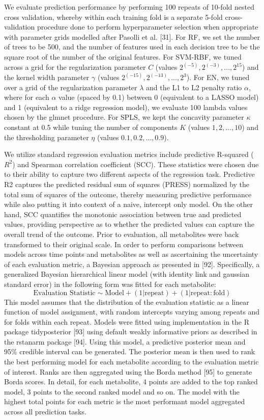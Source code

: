 We evaluate prediction performance by performing 100 repeats of 10-fold nested cross validation, whereby within each training fold is a separate 5-fold cross-validation procedure done to perform hyperparameter selection when appropriate with parameter grids modelled after Pasolli et al. [31]. For RF, we set the number of trees to be 500, and the number of features used in each decision tree to be the square root of the number of the original features. For SVM-RBF, we tuned across a grid for the regularization parameter $C$ (values $2^(-5),2^(-3),...,2^15$) and the kernel width parameter $\gamma$ (values $2^(-15),2^(-13),...,2^3$). For EN, we tuned over a grid of the regularization parameter $\lambda$ and the L1 to L2 penalty ratio $\alpha$, where for each $\alpha$ value (spaced by 0.1) between 0 (equivalent to a LASSO model) and 1 (equivalent to a ridge regression model), we evaluate 100 lambda values chosen by the glmnet procedure. For SPLS, we kept the concavity parameter $\kappa$ constant at 0.5 while tuning the number of components $K$ (values $1,2,…,10$) and the thresholding parameter $\eta$ (values $0.1,0.2,…,0.9$). 

We utilize standard regression evaluation metrics include predictive R-squared ($R^2$) and Spearman correlation coefficient (SCC). These statistics were chosen due to their ability to capture two different aspects of the regression task. Predictive R2 captures the predicted residual sum of squares (PRESS) normalized by the total sum of squares of the outcome, thereby measuring predictive performance while also putting it into context of a naive, intercept only model. On the other hand, SCC quantifies the monotonic association between true and predicted values, providing perspective as to  whether the predicted values can capture the overall trend of the outcome. Prior to evaluation, all metabolites were back transformed to their original scale. In order to perform comparisons between models across time points and metabolites as well as ascertaining the uncertainty of each evaluation metric, a Bayesian approach as presented in [92]. Specifically, a generalized Bayesian hierarchical linear model (with identity link and gaussian standard error) in the following form was fitted for each metabolite:
$$
\text{Evaluation Statistic} \sim \text{Model} + (1 | \text{repeat})+(1 | \text{repeat}:\text{fold})
$$
This model assumes that the distribution of the evaluation statistic as a linear function of model assignment, with random intercepts varying among repeats and for folds within each repeat. Models were fitted using implementation in the R package tidyposterior [93] using default weakly informative priors as described in the rstanarm package [94]. Using this model, a predictive posterior mean and 95\% credible interval can be generated. The posterior mean is then used to rank the best performing model for each metabolite according to the evaluation metric of interest. Ranks are then aggregated using the Borda method [95] to generate Borda scores. In detail, for each metabolite, 4 points are added to the top ranked model, 3 points to the second ranked model and so on. The model with the highest total points for each metric is the most performant model aggregated across all prediction tasks.
